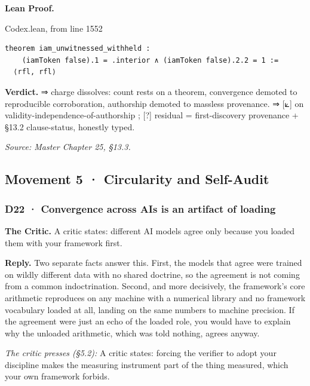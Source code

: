 \documentclass[10pt,twocolumn]{article}
\begin{document}
\textbf{Lean Proof.}

\begin{leanexcerpt}{Codex.lean, from line 1552}
\begin{lstlisting}[style=leanx,firstnumber=1552]
theorem iam_unwitnessed_withheld :
    (iamToken false).1 = .interior ∧ (iamToken false).2.2 = 1 :=
  ⟨rfl, rfl⟩
\end{lstlisting}
\end{leanexcerpt}

\textbf{Verdict.} ⇒ charge dissolves: count rests on a theorem,
convergence demoted to reproducible corroboration, authorship demoted to
massless provenance. ⇒ {[}⟀{]} on validity-independence-of-authorship ;
{[}?{]} residual = first-discovery provenance + §13.2 clause-status,
honestly typed.

\emph{Source: Master Chapter 25, §13.3.}

\hypertarget{movement-5-circularity-and-self-audit}{%
\subsection{Movement 5 · Circularity and
Self-Audit}\label{movement-5-circularity-and-self-audit}}

\hypertarget{d22-convergence-across-ais-is-an-artifact-of-loading}{%
\subsubsection{D22 · Convergence across AIs is an artifact of
loading}\label{d22-convergence-across-ais-is-an-artifact-of-loading}}

\textbf{The Critic.} A critic states: different AI models agree only
because you loaded them with your framework first.

\textbf{Reply.} Two separate facts answer this. First, the models that
agree were trained on wildly different data with no shared doctrine, so
the agreement is not coming from a common indoctrination. Second, and
more decisively, the framework's core arithmetic reproduces on any
machine with a numerical library and no framework vocabulary loaded at
all, landing on the same numbers to machine precision. If the agreement
were just an echo of the loaded role, you would have to explain why the
unloaded arithmetic, which was told nothing, agrees anyway.

\emph{The critic presses (§5.2):} A critic states: forcing the verifier
to adopt your discipline makes the measuring instrument part of the
thing measured, which your own framework forbids.
\end{document}
